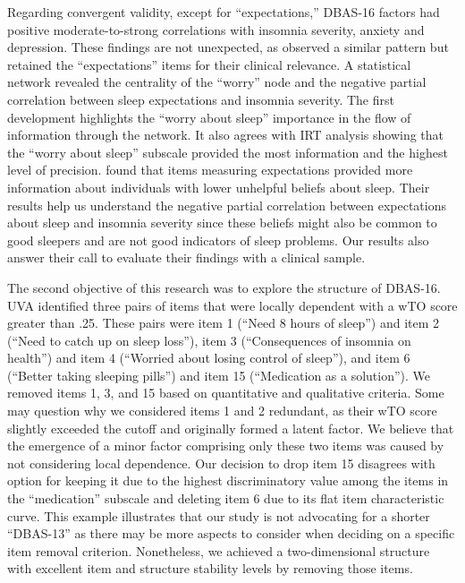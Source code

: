 \documentclass[
  12pt,
  twoside,
  openright,
  a4paper,
  chapter=TITLE,
  section=TITLE,
  brazil]{abntex2}
\begin{document}
Regarding convergent validity, except for ``expectations,'' DBAS-16
factors had positive moderate-to-strong correlations with insomnia
severity, anxiety and depression. These findings are not unexpected, as
\textcite{morin2007a} observed a similar pattern but retained the
``expectations'' items for their clinical relevance. A statistical
network revealed the centrality of the ``worry'' node and the negative
partial correlation between sleep expectations and insomnia severity.
The first development highlights the ``worry about sleep'' importance in
the flow of information through the network. It also agrees with
\textcite{clemente2023} IRT analysis showing that the ``worry about
sleep'' subscale provided the most information and the highest level of
precision. \textcite{clemente2023} found that items measuring
expectations provided more information about individuals with lower
unhelpful beliefs about sleep. Their results help us understand the
negative partial correlation between expectations about sleep and
insomnia severity since these beliefs might also be common to good
sleepers and are not good indicators of sleep problems. Our results also
answer their call to evaluate their findings with a clinical sample.

The second objective of this research was to explore the structure of
DBAS-16. UVA identified three pairs of items that were locally dependent
with a wTO score greater than .25. These pairs were item 1 (``Need 8
hours of sleep'') and item 2 (``Need to catch up on sleep loss''), item
3 (``Consequences of insomnia on health'') and item 4 (``Worried about
losing control of sleep''), and item 6 (``Better taking sleeping
pills'') and item 15 (``Medication as a solution''). We removed items 1,
3, and 15 based on quantitative and qualitative criteria. Some may
question why we considered items 1 and 2 redundant, as their wTO score
slightly exceeded the cutoff and originally formed a latent factor. We
believe that the emergence of a minor factor comprising only these two
items was caused by not considering local dependence. Our decision to
drop item 15 disagrees with \textcite{clemente2023} option for keeping
it due to the highest discriminatory value among the items in the
``medication'' subscale and deleting item 6 due to its flat item
characteristic curve. This example illustrates that our study is not
advocating for a shorter ``DBAS-13'' as there may be more aspects to
consider when deciding on a specific item removal criterion.
Nonetheless, we achieved a two-dimensional structure with excellent item
and structure stability levels by removing those items.
\end{document}
